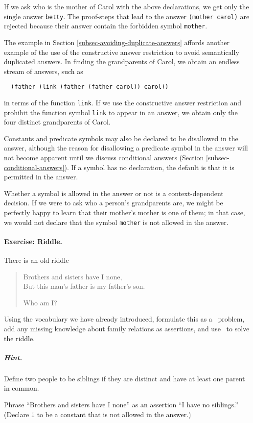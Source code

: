 If we ask who is the mother of Carol with the above declarations, we
get only the single answer {\tt betty}.  The proof-steps that lead to
the answer \verb'(mother carol)' are rejected because their answer
contain the forbidden symbol {\tt mother}.

The example in Section \ref{subsec-avoiding-duplicate-answers} affords
another example of the use of the constructive answer restriction to
avoid semantically duplicated answers.  In finding the grandparents of
Carol, we obtain an endless stream of answers, such as
\begin{verbatim}
  (father (link (father (father carol)) carol))
\end{verbatim}
in terms of the function {\tt link}.  If we use the constructive
answer restriction and prohibit the function symbol {\tt link} to
appear in an answer, we obtain only the four distinct grandparents of
Carol.

Constants and predicate symbols may also be declared to be disallowed
in the answer, although the reason for disallowing a predicate symbol
in the answer will not become apparent until we discuss conditional
answers (Section \ref{subsec-conditional-answers}).  If a symbol has
no declaration, the default is that it is permitted in the answer.

Whether a symbol is allowed in the answer or not is a
context-dependent decision.  If we were to ask who a person's
grandparents are, we might be perfectly happy to learn that their
mother's mother is one of them; in that case, we would not declare
that the symbol {\tt mother} is not allowed in the answer.

\paragraph{Exercise: Riddle.}
\label{exer-riddle}
There is an old riddle
\begin{verse}
Brothers and sisters have I none,\\
But this man's father is my father's son.

Who am I?
\end{verse}
Using the vocabulary we have already introduced, formulate this as a
\snark\  problem, add any missing knowledge about family relations as
assertions, and use \snark\  to solve the riddle.

\subparagraph{Hint.}
Define two people to be siblings if they are distinct and have at
least one parent in common.

Phrase ``Brothers and sisters have I none'' as an
assertion ``I have no siblings.''  (Declare {\tt i} to be a constant
that is not allowed in the answer.)

